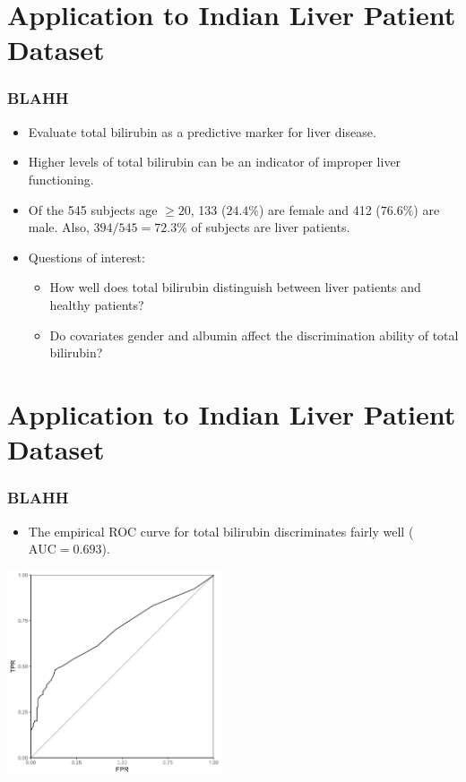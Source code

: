 \documentclass[t]{beamer}
\begin{document}
\section{Application to Indian Liver Patient Dataset}

\begin{frame}
	\frametitle{BLAHH}
	\begin{itemize}
		\item Evaluate total bilirubin as a predictive marker for liver disease.
		\item Higher levels of total bilirubin can be an indicator of improper liver functioning.
		\item Of the 545 subjects age $\geq 20$, 133 ($24.4\%$) are female and 412 ($76.6\%$) are male. Also, $394 / 545 = 72.3\%$ of subjects are liver patients.
		\item Questions of interest:
		\begin{itemize}
			\item How well does total bilirubin distinguish between liver patients and healthy patients?
			\item Do covariates gender and albumin affect the discrimination ability of total bilirubin?
		\end{itemize}
	\end{itemize}
\end{frame}

\section{Application to Indian Liver Patient Dataset}

\begin{frame}
	\frametitle{BLAHH}
	\begin{itemize}
		\item The empirical ROC curve for total bilirubin discriminates fairly well ($\text{AUC} = 0.693$).
	\end{itemize}
\begin{center}
\includegraphics[width = 2.5in]{ilpd_emp}
\end{center}
\end{frame}
\end{document}
